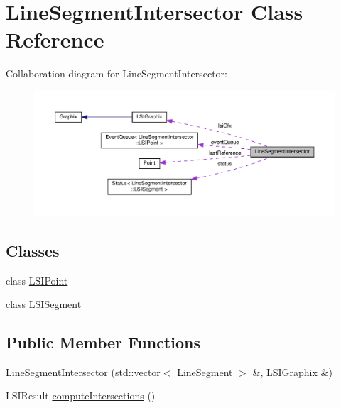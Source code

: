 \hypertarget{classLineSegmentIntersector}{}\section{Line\+Segment\+Intersector Class Reference}
\label{classLineSegmentIntersector}


Collaboration diagram for Line\+Segment\+Intersector\+:
\nopagebreak
\begin{figure}[H]
\begin{center}
\leavevmode
\includegraphics[width=350pt]{classLineSegmentIntersector__coll__graph}
\end{center}
\end{figure}
\subsection*{Classes}
\begin{DoxyCompactItemize}
\item 
class \hyperlink{classLineSegmentIntersector_1_1LSIPoint}{L\+S\+I\+Point}
\item 
class \hyperlink{classLineSegmentIntersector_1_1LSISegment}{L\+S\+I\+Segment}
\end{DoxyCompactItemize}
\subsection*{Public Member Functions}
\begin{DoxyCompactItemize}
\item 
\hyperlink{classLineSegmentIntersector_abfe17083938ad4ee705fbe7d0051f209}{Line\+Segment\+Intersector} (std\+::vector$<$ \hyperlink{classLineSegment}{Line\+Segment} $>$ \&, \hyperlink{classLSIGraphix}{L\+S\+I\+Graphix} \&)
\item 
L\+S\+I\+Result \hyperlink{classLineSegmentIntersector_a261dcce43777e1954e81589ca89529ee}{compute\+Intersections} ()
\end{DoxyCompactItemize}
